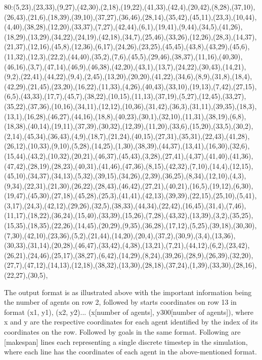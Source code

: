 80:(5,23),(23,33),(9,27),(42,30),(2,18),(19,22),(41,33),(42,4),(20,42),(8,28),(37,10),(26,43),(21,6),(18,39),(39,10),(37,27),(36,46),(28,14),(35,42),(45,11),(23,3),(10,44),(4,40),(38,28),(12,20),(33,37),(7,27),(42,44),(6,1),(19,41),(9,44),(34,5),(41,26),(18,29),(13,29),(34,22),(24,19),(42,18),(34,7),(25,46),(33,26),(12,26),(28,3),(14,37),(21,37),(12,16),(45,8),(12,36),(6,17),(24,26),(23,25),(45,45),(43,8),(43,29),(45,6),(11,32),(12,3),(22,2),(44,40),(35,2),(7,6),(45,5),(29,46),(38,37),(11,16),(40,30),(46,16),(3,7),(47,14),(46,9),(46,38),(42,20),(43,1),(13,7),(24,22),(30,43),(14,21),(9,2),(22,41),(44,22),(9,4),(2,45),(13,20),(20,20),(41,22),(34,6),(8,9),(31,8),(18,4),(42,29),(21,45),(23,20),(16,22),(11,33),(4,26),(40,43),(33,10),(19,13),(7,42),(27,15),(6,5),(43,33),(17,7),(45,7),(38,22),(10,15),(11,13),(37,19),(5,27),(12,45),(33,27),(35,22),(37,36),(10,16),(34,11),(12,12),(10,36),(31,42),(36,3),(31,11),(39,35),(18,3),(13,1),(16,28),(46,27),(44,16),(18,8),(40,23),(30,1),(32,10),(11,31),(38,19),(6,8),(18,38),(40,14),(19,11),(37,39),(30,32),(12,39),(11,20),(33,6),(15,20),(33,5),(30,2),(2,14),(45,34),(36,43),(4,9),(18,7),(21,24),(40,15),(27,31),(35,31),(22,43),(41,28),(26,12),(10,33),(9,10),(5,28),(14,25),(1,30),(38,39),(44,37),(13,41),(16,30),(32,6),(15,44),(43,2),(10,32),(20,21),(46,37),(45,43),(3,28),(27,41),(4,37),(41,40),(41,36),(47,42),(28,19),(28,23),(40,31),(41,46),(47,36),(8,15),(42,32),(7,10),(14,4),(12,15),(45,10),(34,37),(34,13),(5,32),(39,15),(34,26),(2,39),(36,25),(8,34),(12,10),(4,3),(9,34),(22,31),(21,30),(26,22),(28,43),(46,42),(27,21),(40,21),(16,5),(19,12),(6,30),(19,47),(45,30),(27,18),(45,28),(25,3),(41,41),(42,13),(39,39),(22,15),(25,10),(5,41),(3,17),(24,3),(42,12),(29,26),(32,5),(38,33),(44,34),(22,42),(16,45),(31,4),(7,46),(11,17),(18,22),(36,24),(15,40),(33,39),(15,26),(7,28),(43,32),(13,39),(3,2),(35,25),(15,35),(18,35),(22,26),(14,45),(20,29),(9,35),(36,28),(17,12),(5,25),(39,18),(30,30),(7,30),(42,10),(23,36),(5,2),(21,44),(14,20),(20,4),(37,2),(30,9),(3,4),(13,36),(30,33),(31,14),(20,28),(46,47),(33,42),(4,38),(13,21),(7,21),(44,12),(6,2),(23,42),(26,21),(24,46),(25,17),(38,27),(6,42),(14,29),(8,24),(39,26),(28,9),(26,39),(32,20),(27,7),(47,12),(14,13),(12,18),(38,32),(13,30),(28,18),(37,24),(1,39),(33,30),(28,16),(22,27),(30,5),


\endtt
The output format is as illustrated above with the important information being the number of agents on row 2, followed by starts coordinates on row 13 in format (x1, y1), (x2, y2)... (x[number of agents], y300[number of agents]),  where x and y are the respective coordinates for each agent identified by the index of its coordinates on the row. Followed by goals in the same format. Following are [makespan] lines each representing a single discrete timestep in the simulation, where each line has the coordinates of each agent in the above-mentioned format.

